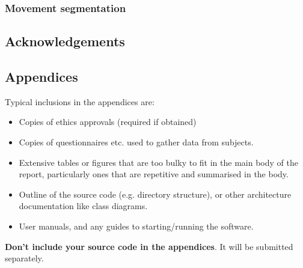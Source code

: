 \documentclass{l4proj}
\begin{document}
\subsection{Movement segmentation}

\section{Acknowledgements}

%
% 

\begin{appendices}

\chapter{Appendices}

Typical inclusions in the appendices are:

\begin{itemize}
\item
  Copies of ethics approvals (required if obtained)
\item
  Copies of questionnaires etc. used to gather data from subjects.
\item
  Extensive tables or figures that are too bulky to fit in the main body of
  the report, particularly ones that are repetitive and summarised in the body.

\item Outline of the source code (e.g. directory structure), or other architecture documentation like class diagrams.

\item User manuals, and any guides to starting/running the software.

\end{itemize}

\textbf{Don't include your source code in the appendices}. It will be
submitted separately.

\end{appendices}






\end{document}
